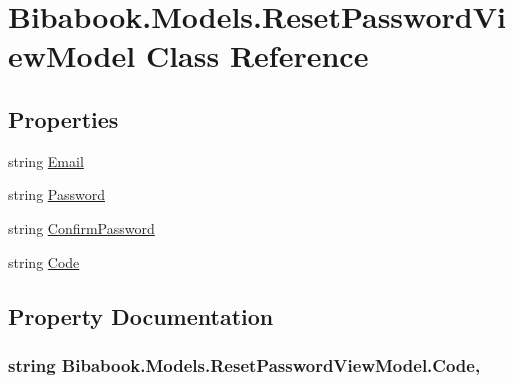 \hypertarget{class_bibabook_1_1_models_1_1_reset_password_view_model}{}\section{Bibabook.\+Models.\+Reset\+Password\+View\+Model Class Reference}
\label{class_bibabook_1_1_models_1_1_reset_password_view_model}
\subsection*{Properties}
\begin{DoxyCompactItemize}
\item 
string \hyperlink{class_bibabook_1_1_models_1_1_reset_password_view_model_a0e8dc35a8fa18abf7040660b41adbf99}{Email}
\item 
string \hyperlink{class_bibabook_1_1_models_1_1_reset_password_view_model_ad35ad3fa2c5eb086b2c0d38912f27fc5}{Password}
\item 
string \hyperlink{class_bibabook_1_1_models_1_1_reset_password_view_model_a20b683f5b74a7c341232c836b70c1e5e}{Confirm\+Password}
\item 
string \hyperlink{class_bibabook_1_1_models_1_1_reset_password_view_model_a90803972046765f6e46e3a475abe7d7d}{Code}
\end{DoxyCompactItemize}


\subsection{Property Documentation}
\hypertarget{class_bibabook_1_1_models_1_1_reset_password_view_model_a90803972046765f6e46e3a475abe7d7d}{}
\subsubsection[{Code}]{\setlength{\rightskip}{0pt plus 5cm}string Bibabook.\+Models.\+Reset\+Password\+View\+Model.\+Code\hspace{0.3cm}{\ttfamily [get]}, {\ttfamily [set]}}\label{class_bibabook_1_1_models_1_1_reset_password_view_model_a90803972046765f6e46e3a475abe7d7d}
\hypertarget{class_bibabook_1_1_models_1_1_reset_password_view_model_a20b683f5b74a7c341232c836b70c1e5e}{}
